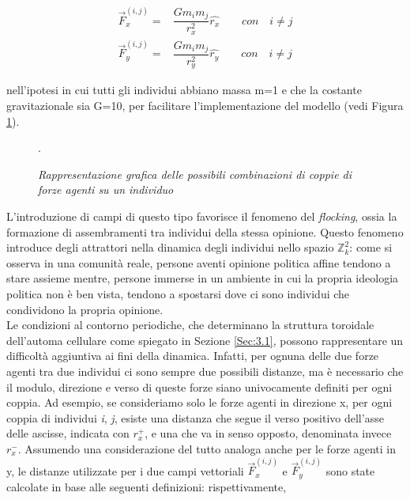 \documentclass{article}
\newcommand{\Zii}{$\mathbb{Z}^2_k$}
\begin{document}
\begin{equation}
\begin{aligned}
    \vec{F}_x^{(i,j)} =& \dfrac{Gm_im_j}{r_x^2} \hat{r_x} \quad\quad con \quad i\neq j\\
    \vec{F}_y^{(i,j)} =& \dfrac{Gm_im_j}{r_y^2} \hat{r_y} \quad\quad con \quad i\neq j
\end{aligned}
\end{equation}

nell'ipotesi in cui tutti gli individui abbiano massa m=1 e che la costante gravitazionale sia G=10, per facilitare l'implementazione del modello (vedi Figura \ref{Fig:7}). 

\begin{figure}[h]
\centering
{}
\caption{\textit{Rappresentazione grafica delle possibili combinazioni di coppie di forze agenti su un individuo}}.
\label{Fig:7}
\end{figure}

L'introduzione di campi di questo tipo favorisce il fenomeno del \textit{flocking}, ossia la formazione di assembramenti tra individui della stessa opinione. Questo fenomeno introduce degli attrattori nella dinamica degli individui nello spazio \Zii: come si osserva in una comunità reale, persone aventi opinione politica affine tendono a stare assieme mentre, persone immerse in un ambiente in cui la propria ideologia politica non è ben vista, tendono a spostarsi dove ci sono individui che condividono la propria opinione.
\\
Le condizioni al contorno periodiche, che determinano la struttura toroidale dell'automa cellulare come spiegato in Sezione \ref{Sec:3.1}, possono rappresentare un difficoltà aggiuntiva ai fini della dinamica. Infatti, per ognuna delle due forze agenti tra due individui ci sono sempre due possibili distanze, ma è necessario che il modulo, direzione e verso di queste forze siano univocamente definiti per ogni coppia. Ad esempio, se consideriamo solo le forze agenti in direzione x, per ogni coppia di individui \textit{i}, \textit{j}, esiste una distanza che segue il verso positivo dell'asse delle ascisse, indicata con $r_x^+$, e una che va in senso opposto, denominata invece $r_x^-$. Assumendo una considerazione del tutto analoga anche per le forze agenti in y, le distanze utilizzate per i due campi vettoriali $\vec{F}^{(i,j)}_x$ e $\vec{F}^{(i,j)}_y$ sono state calcolate in base alle seguenti definizioni: rispettivamente,
\end{document}
